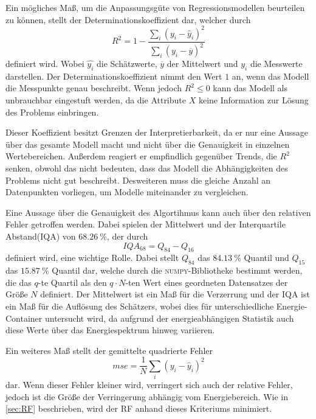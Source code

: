 Ein mögliches Maß, um die Anpassungsgüte von Regressionsmodellen beurteilen zu können, stellt der Determinationskoeffizient dar, welcher
durch
\begin{equation}
  R^2 = 1 - \frac{\sum_i (y_i-\hat{y}_i)^2}{\sum_i (y_i - \overline{y})^2}
\end{equation}
definiert wird. Wobei $\hat{y_i}$ die Schätzwerte, $\overline{y}$ der Mittelwert und $y_i$ die Messwerte darstellen.
Der Determinationskoeffizient nimmt den Wert $1$ an, wenn das Modell die Messpunkte genau beschreibt. Wenn jedoch
$R^2 \leq 0$ kann das Modell als unbrauchbar eingestuft werden, da die Attribute $X$ keine Information zur
Lösung des Problems einbringen.

Dieser Koeffizient besitzt Grenzen der Interpretierbarkeit, da er nur eine Aussage über das gesamte Modell macht und
nicht über die Genauigkeit in einzelnen Wertebereichen.
Außerdem reagiert er empfindlich gegenüber Trends, die $R^2$ senken, obwohl das nicht bedeuten, dass das Modell die Abhängigkeiten des Problems
nicht gut beschreibt.
Desweiteren muss die gleiche Anzahl an Datenpunkten vorliegen, um Modelle
miteinander zu vergleichen.

Eine Aussage über die Genauigkeit des Algortihmus kann auch über den relativen Fehler getroffen werden. Dabei spielen der Mittelwert und der
Interquartile Abstand(IQA) von $\SI{68.26}{\percent}$, der durch
\begin{equation}
  IQA_{68} = Q_{84}-Q_{16}
\end{equation}
definiert wird, eine wichtige Rolle.
Dabei stellt $Q_{84}$ das $\SI{84.13}{\percent}$ Quantil und $Q_{15}$ das $\SI{15.87}{\percent}$ Quantil dar, welche durch die \textsc{numpy}-Bibliotheke\cite{scipy}
bestimmt werden, die das $q$-te Quartil als den $q \cdot N$-ten Wert eines geordneten Datensatzes der Größe $N$ definiert.
Der Mittelwert ist ein Maß für die Verzerrung und der IQA ist ein Maß für die Auflösung des Schätzers, wobei dies für unterschiedliche
Energie-Container untersucht wird, da aufgrund der energieabhängigen Statistik auch diese Werte über das Energiespektrum hinweg variieren.

Ein weiteres Maß stellt der gemittelte quadrierte Fehler
\begin{equation}
  mse = \frac{1}{N} \sum_i (y_i-\hat{y}_i)^2
\end{equation}
dar.
Wenn dieser Fehler kleiner wird, verringert sich auch der relative Fehler, jedoch ist die Größe der Verringerung abhängig vom Energiebereich.
Wie in \autoref{sec:RF} beschrieben, wird der RF anhand dieses Kriteriums minimiert.


